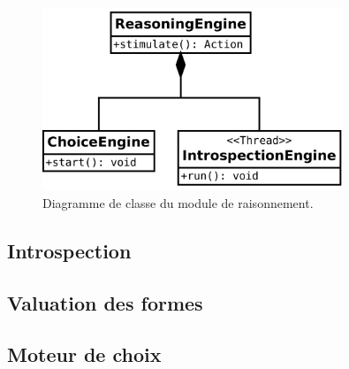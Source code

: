 
\begin{figure}[H] 
\center
\includegraphics[width=0.8\textwidth]{files/class_diagram/reasoningEngine} 
\caption{Diagramme de classe du module de raisonnement.}
\label{img_reco_forme_0}
\end{figure}

\subsection{Introspection}



\subsection{Valuation des formes}



\subsection{Moteur de choix}
